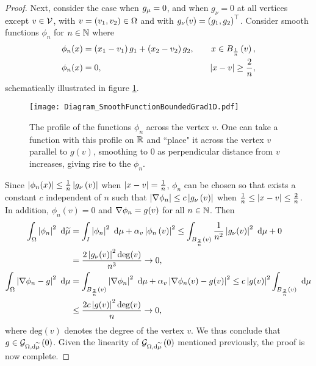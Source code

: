 \begin{proof}
	Next, consider the case when $g_{\mu}=0$, and when $g_{\nu}=0$ at all vertices except $v\in\mathcal{V}$, with $v=\left( v_1, v_2 \right)\in\Omega$ and with $g_{\nu}(v) = \left( g_1, g_2 \right)^\top$.
	Consider smooth functions $\phi_n$ for $n\in\mathbb{N}$ where
	\begin{align*}
		\phi_n(x) &= \left( x_1 - v_1 \right) g_1 + \left( x_2 - v_2 \right)g_2, &\quad x\in B_{\frac{1}{n}}\left( v \right), \\
		\phi_n(x) &= 0, &\quad \left\lvert x - v \right\rvert \geq \frac{2}{n},
	\end{align*}
	schematically illustrated in figure \ref{fig:Diagram_SmoothFunctionBoundedGrad1D}.
	\begin{figure}[b]
		\centering
		\texttt{[image: Diagram\_SmoothFunctionBoundedGrad1D.pdf]}
		\caption{\label{fig:Diagram_SmoothFunctionBoundedGrad1D} The profile of the functions $\phi_n$ across the vertex $v$. One can take a function with this profile on $\mathbb{R}$ and ``place" it across the vertex $v$ parallel to $g(v)$, smoothing to 0 as perpendicular distance from $v$ increases, giving rise to the $\phi_n$.}
	\end{figure}
	Since $\left\lvert \phi_n(x) \right\rvert \leq \frac{1}{n}\left\lvert g_{\nu}\left( v \right) \right\rvert$ when $\left\lvert x-v \right\rvert=\frac{1}{n}$, $\phi_n$ can be chosen so that exists a constant $c$ independent of $n$ such that $\left\lvert \nabla\phi_n \right\rvert \leq c\left\lvert g_{\nu}\left( v \right) \right\rvert$ when $\frac{1}{n} \leq \left\lvert x-v \right\rvert \leq \frac{2}{n}$.
	In addition, $\phi_n(v)=0$ and $\nabla\phi_n=g(v)$ for all $n\in\mathbb{N}$.
	Then
	\begin{align*}
		\int_{\Omega}\left\lvert \phi_n \right\rvert^2 \ \mathrm{d}\widetilde{\mu} 
		&= \int_{I} \left\lvert \phi_n \right\rvert^2  \ \mathrm{d}\mu + \alpha_v\left\lvert \phi_n\left( v \right) \right\rvert^2
		\leq \int_{B_{\frac{2}{n}}(v)} \frac{1}{n^2}\left\lvert g_{\nu}(v) \right\rvert^2  \ \mathrm{d}\mu + 0 \\
		&= \frac{2\left\lvert g_{\nu}(v) \right\rvert^2 \mathrm{deg}(v)}{n^3} \rightarrow 0, \\
		\int_{\Omega} \left\lvert \nabla\phi_n - g \right\rvert^2  \ \mathrm{d}\mu
		&= \int_{B_{\frac{2}{n}}(v)} \left\lvert \nabla\phi_n \right\rvert^2  \ \mathrm{d}\mu + \alpha_v\left\lvert \nabla\phi_n(v)-g(v) \right\rvert^2
		\leq c\left\lvert g(v) \right\rvert^2\int_{B_{\frac{2}{n}}(v)}  \ \mathrm{d}\mu \\
		&\leq \frac{2c\left\lvert g(v) \right\rvert^2 \mathrm{deg}(v)}{n} \rightarrow 0,
	\end{align*}
	where $\mathrm{deg}(v)$ denotes the degree of the vertex $v$.
	We thus conclude that $g\in\mathcal{G}_{ \Omega, \mathrm{d}\widetilde{\mu}}\left( 0 \right)$.
	Given the linearity of $\mathcal{G}_{ \Omega, \mathrm{d}\widetilde{\mu}}\left( 0 \right)$ mentioned previously, the proof is now complete.
\end{proof}


